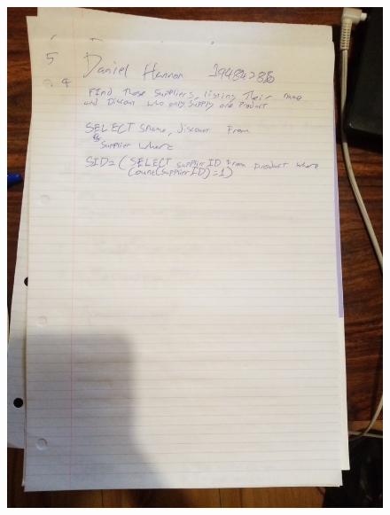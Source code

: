 \documentclass{article}
\begin{document}
	\begin{figure}
		\centering
		\includegraphics[width=\textwidth]{IMG_20210113_113134}
	\end{figure}
	\newpage
\end{document}
